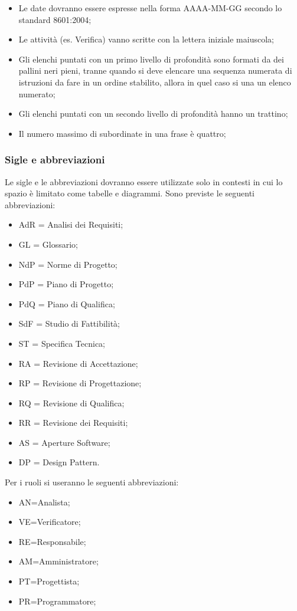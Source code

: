\begin{itemize}
\item Le date dovranno essere espresse nella forma AAAA-MM-GG secondo lo standard  8601:2004;
\item Le attività (es. Verifica) vanno scritte con la lettera iniziale maiuscola;
\item Gli elenchi puntati con un primo livello di profondità sono formati da dei pallini neri pieni, tranne quando si deve elencare una sequenza numerata di istruzioni da fare in un ordine stabilito, allora in quel caso si una un elenco numerato; 
\item Gli elenchi puntati con un secondo livello di profondità hanno un trattino;
\item Il numero massimo di subordinate in una frase è quattro;
\end{itemize}

\subsubsection{Sigle e abbreviazioni \\}
\label{5.5}
Le sigle e le abbreviazioni dovranno essere utilizzate solo in contesti in cui lo spazio è limitato come tabelle e diagrammi. Sono previste le seguenti abbreviazioni:
\begin{itemize}
\item AdR = Analisi dei Requisiti;
\item GL = Glossario;
\item NdP = Norme di Progetto;
\item PdP = Piano di Progetto;
\item PdQ = Piano di Qualifica;
\item SdF = Studio di Fattibilità;
\item ST = Specifica Tecnica;
\item RA = Revisione di Accettazione;
\item RP = Revisione di Progettazione;
\item RQ = Revisione di Qualifica;
\item RR = Revisione dei Requisiti;
\item AS = Aperture Software;
\item DP = Design Pattern.
\end{itemize}
Per i ruoli si useranno le seguenti abbreviazioni:
\begin{itemize}
\item AN=Analista;
\item VE=Verificatore;
\item RE=Responsabile;
\item AM=Amministratore;
\item PT=Progettista;
\item PR=Programmatore;
\end{itemize}

